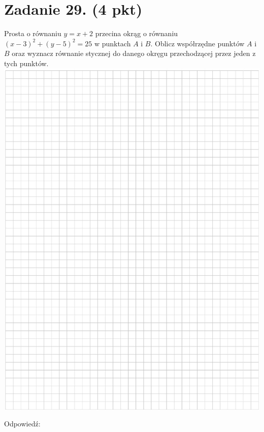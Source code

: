 \documentclass[10pt]{article}
\begin{document}
\section*{Zadanie 29. (4 pkt)}
Prosta o równaniu \(y=x+2\) przecina okrąg o równaniu \((x-3)^{2}+(y-5)^{2}=25\) w punktach \(A\) i \(B\). Oblicz współrzędne punktów \(A\) i \(B\) oraz wyznacz równanie stycznej do danego okręgu przechodzącej przez jeden z tych punktów.\\
\includegraphics[max width=\textwidth, center]{2024_11_21_2c2c97b7feae6d70b078g-13}

Odpowiedź: \(\qquad\)
\end{document}
